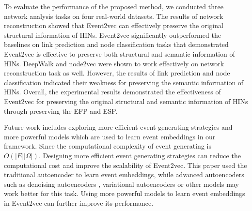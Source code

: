 To evaluate the performance of the proposed method, we conducted three network analysis tasks on four real-world datasets. The results of network reconstruction showed that Event2vec can effectively preserve the original structural information of HINs. Event2vec significantly outperformed the baselines on link prediction and node classification tasks that demonstrated Event2vec is effective to preserve both structural and semantic information of HINs. DeepWalk and node2vec were shown to work effectively on network reconstruction task as well. However, the results of link prediction and node classification indicated their weakness for preserving the semantic information of HINs. Overall, the experimental results demonstrated the effectiveness of Event2vec for preserving the original structural and semantic information of HINs through preserving the EFP and ESP.

Future work includes exploring more efficient event generating strategies and more powerful models which are used to learn event embeddings in our framework. Since the computational complexity of event generating is $O(|E||\Omega|)$. Designing more efficient event generating strategies can reduce the computational cost and improve the scalability of Event2vec. This paper used the traditional autoencoder to learn event embeddings, while advanced autoencoders such as denoising autoencoders \cite{vincent2010stacked}, variational autoencoders \cite{doersch2016tutorial} or other models may work better for this task. Using more powerful models to learn event embeddings in Event2vec can further improve its performance.
